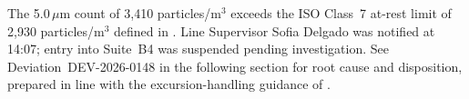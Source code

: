 \begin{tcolorbox}[colback=white,colframe=alertred,boxrule=0.8pt,arc=2pt,
  title={\faExclamationTriangle\ Exceedance Noted -- 14:00 Reading, Suite B4},
  fonttitle=\bfseries,colbacktitle=alertred,coltitle=white]
The 5.0\,$\mu$m count of 3{,}410 particles/m$^3$ exceeds the ISO Class~7 at-rest limit of
2{,}930 particles/m$^3$ defined in \cite{iso14644-1}. Line Supervisor Sofia Delgado was
notified at 14:07; entry into Suite~B4 was suspended pending investigation. See
Deviation~DEV-2026-0148 in the following section for root cause and disposition, prepared
in line with the excursion-handling guidance of \cite{iso14644-2}.
\end{tcolorbox}
